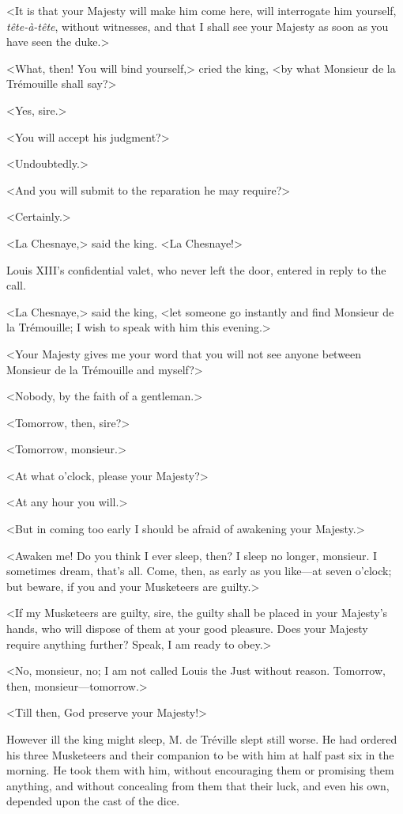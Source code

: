 <It is that your Majesty will make him come here, will interrogate him yourself, \textit{tête-à-tête}, without witnesses, and that I shall see your Majesty as soon as you have seen the duke.> 

<What, then! You will bind yourself,> cried the king, <by what Monsieur de la Trémouille shall say?> 

<Yes, sire.> 

<You will accept his judgment?> 

<Undoubtedly.> 

<And you will submit to the reparation he may require?> 

<Certainly.> 

<La Chesnaye,> said the king. <La Chesnaye!> 

Louis XIII's confidential valet, who never left the door, entered in reply to the call. 

<La Chesnaye,> said the king, <let someone go instantly and find Monsieur de la Trémouille; I wish to speak with him this evening.> 

<Your Majesty gives me your word that you will not see anyone between Monsieur de la Trémouille and myself?> 

<Nobody, by the faith of a gentleman.> 

<Tomorrow, then, sire?> 

<Tomorrow, monsieur.> 

<At what o'clock, please your Majesty?> 

<At any hour you will.> 

<But in coming too early I should be afraid of awakening your Majesty.> 

<Awaken me! Do you think I ever sleep, then? I sleep no longer, monsieur. I sometimes dream, that's all. Come, then, as early as you like---at seven o'clock; but beware, if you and your Musketeers are guilty.> 

<If my Musketeers are guilty, sire, the guilty shall be placed in your Majesty's hands, who will dispose of them at your good pleasure. Does your Majesty require anything further? Speak, I am ready to obey.> 

<No, monsieur, no; I am not called Louis the Just without reason. Tomorrow, then, monsieur---tomorrow.> 

<Till then, God preserve your Majesty!> 

However ill the king might sleep, M. de Tréville slept still worse. He had ordered his three Musketeers and their companion to be with him at half past six in the morning. He took them with him, without encouraging them or promising them anything, and without concealing from them that their luck, and even his own, depended upon the cast of the dice. 

